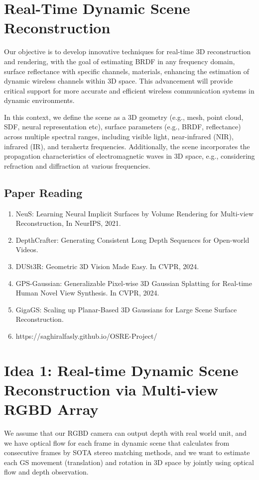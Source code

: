\section{Real-Time Dynamic Scene Reconstruction}
Our objective is to develop innovative techniques for real-time 3D reconstruction and rendering, with the goal of estimating BRDF in any frequency domain, surface reflectance with specific channels, materials, enhancing the estimation of dynamic wireless channels within 3D space. This advancement will provide critical support for more accurate and efficient wireless communication systems in dynamic environments. 

In this context, we define the scene as a 3D geometry (e.g., mesh, point cloud, SDF, neural representation etc), surface parameters (e.g., BRDF, reflectance) across multiple spectral ranges, including visible light, near-infrared (NIR), infrared (IR), and terahertz frequencies. Additionally, the scene incorporates the propagation characteristics of electromagnetic waves in 3D space, e.g., considering refraction and diffraction at various frequencies.

\subsection{Paper Reading}
\begin{enumerate}
	\item NeuS: Learning Neural Implicit Surfaces by Volume Rendering for Multi-view Reconstruction, In NeurIPS, 2021. 
	\item DepthCrafter: Generating Consistent Long Depth Sequences
	for Open-world Videos.
	\item DUSt3R: Geometric 3D Vision Made Easy. In CVPR, 2024.
	\item GPS-Gaussian: Generalizable Pixel-wise 3D Gaussian Splatting for Real-time Human Novel View Synthesis. In CVPR, 2024.
	\item GigaGS: Scaling up Planar-Based 3D Gaussians for Large Scene Surface Reconstruction. 
	\item https://saghiralfasly.github.io/OSRE-Project/
\end{enumerate}


\section{Idea 1: Real-time Dynamic Scene Reconstruction via Multi-view RGBD Array}
We assume that our RGBD camera can output depth with real world unit, and we have optical flow for each frame in dynamic scene that calculates from consecutive frames by SOTA stereo matching methods, and we want to estimate each GS movement (translation) and rotation in 3D space by jointly using optical flow and depth observation.
  

